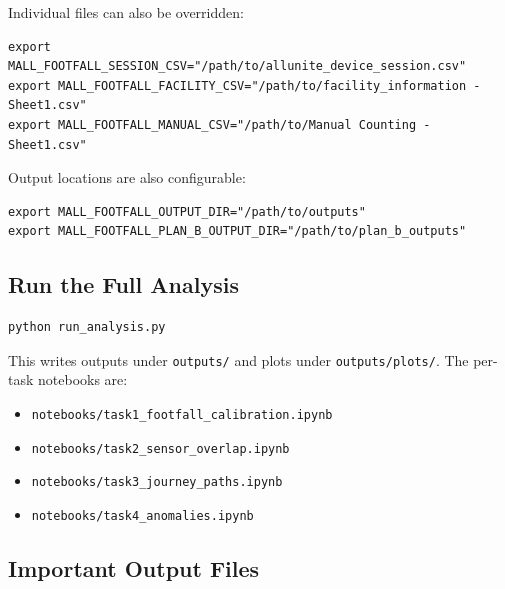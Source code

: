 \documentclass[11pt,a4paper]{article}
\begin{document}
Individual files can also be overridden:
\begin{verbatim}
export MALL_FOOTFALL_SESSION_CSV="/path/to/allunite_device_session.csv"
export MALL_FOOTFALL_FACILITY_CSV="/path/to/facility_information - Sheet1.csv"
export MALL_FOOTFALL_MANUAL_CSV="/path/to/Manual Counting - Sheet1.csv"
\end{verbatim}

Output locations are also configurable:
\begin{verbatim}
export MALL_FOOTFALL_OUTPUT_DIR="/path/to/outputs"
export MALL_FOOTFALL_PLAN_B_OUTPUT_DIR="/path/to/plan_b_outputs"
\end{verbatim}

\subsection{Run the Full Analysis}

\begin{verbatim}
python run_analysis.py
\end{verbatim}

This writes outputs under \texttt{outputs/} and plots under \texttt{outputs/plots/}. The per-task notebooks are:
\begin{itemize}
  \item \texttt{notebooks/task1\_footfall\_calibration.ipynb}
  \item \texttt{notebooks/task2\_sensor\_overlap.ipynb}
  \item \texttt{notebooks/task3\_journey\_paths.ipynb}
  \item \texttt{notebooks/task4\_anomalies.ipynb}
\end{itemize}

\subsection{Important Output Files}
\end{document}
